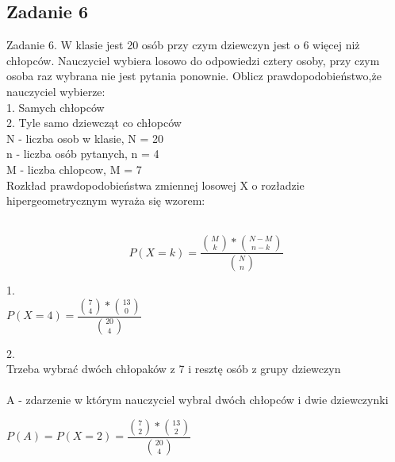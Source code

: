 \subsection{Zadanie 6}


\setlength\parindent{0pt}



Zadanie 6.  W klasie jest 20 osób przy czym dziewczyn jest o 6 więcej niż chłopców. Nauczyciel wybiera losowo do odpowiedzi cztery osoby, przy czym osoba raz wybrana nie jest pytania ponownie. Oblicz prawdopodobieństwo,że nauczyciel wybierze:\\



1. Samych chłopców
\\
2. Tyle samo dziewcząt co chłopców
\\


N - liczba osob w klasie, N = 20
\\
n - liczba osób pytanych, n = 4
\\
M - liczba chlopcow, M = 7
\\

Rozkład prawdopodobieństwa zmiennej losowej X o rozładzie hipergeometrycznym wyraża się wzorem:

\\

$$
P(X=k) = \dfrac{\binom{M}{k} * \binom{N-M}{n-k}}{\binom{N}{n}}
$$


1.\\
$
P(X=4)= \dfrac{\binom{7}{4} * \binom{13}{0}}{\binom{20}{4}}
$

2.
\\

Trzeba wybrać dwóch chłopaków z 7 i resztę osób z grupy dziewczyn
\\

\\
A - zdarzenie w którym nauczyciel wybral dwóch chłopców i dwie dziewczynki


$
P(A) = P(X=2)= \dfrac{\binom{7}{2} * \binom{13}{2}}{\binom{20}{4}}
$
